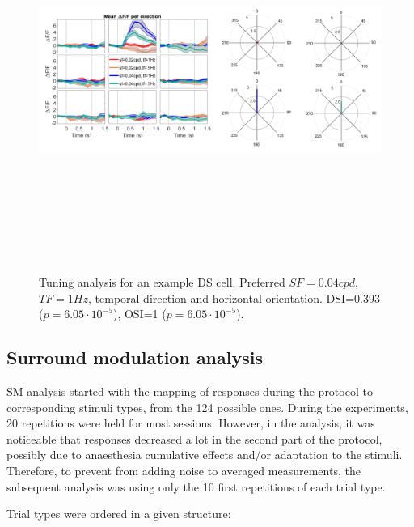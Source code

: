 \begin{figure}[H] \centering \includegraphics[width=12.5cm,height=12.5cm,keepaspectratio]{Figures/7.Results/tuning/CM006_pos1_p4_ROI0138.png} 
\caption{Tuning analysis for an example DS cell. Preferred $SF=0.04 cpd$, $TF=1 Hz$, temporal direction and horizontal orientation. DSI=0.393 ($p=6.05 \cdot 10^{-5}$), OSI=1 ($p=6.05 \cdot 10^{-5}$).}
\label{tuninganalysisDS}
\end{figure}

\subsection{Surround modulation analysis}
\label{cap:Methods}

SM analysis started with the mapping of responses during the protocol to corresponding stimuli types, from the 124 possible ones. During the experiments, 20 repetitions were held for most sessions. However, in the analysis, it was noticeable that responses decreased a lot in the second part of the protocol, possibly due to anaesthesia cumulative effects and/or adaptation to the stimuli. Therefore, to prevent from adding noise to averaged measurements, the subsequent analysis was using only the 10 first repetitions of each trial type.

Trial types were ordered in a given structure:


